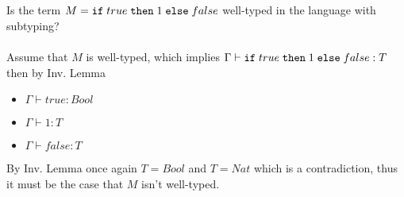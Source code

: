 \subsection{}

Is the term $M = \texttt{if}\;true\;\texttt{then}\;1\;\texttt{else}\;false$ well-typed in the language with subtyping?\\~\\
Assume that $M$ is well-typed, which implies $\Gamma \vdash \texttt{if}\;true\;\texttt{then}\;1\;\texttt{else}\;false: T$ then by Inv.
Lemma
\begin{itemize}
	\item $\Gamma \vdash true: Bool$
	\item $\Gamma \vdash 1: T$
	\item $\Gamma \vdash false: T$
\end{itemize}

By Inv. Lemma once again $T = Bool$ and $T = Nat$ which is a contradiction, thus it must be the
case that $M$ isn't well-typed.
